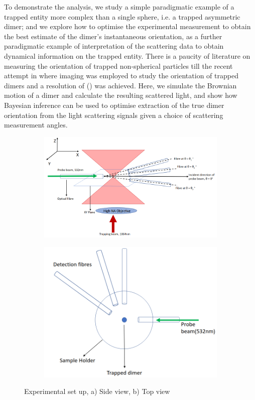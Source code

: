 \documentclass[final, 3p]{elsarticle}
\begin{document}
To demonstrate the analysis, we study a simple paradigmatic example of a trapped entity more complex than a single sphere, i.e. a trapped asymmetric dimer; and we explore how to optimise the experimental measurement to obtain the best estimate of the dimer's instantaneous orientation, as a further paradigmatic example of interpretation of the scattering data to obtain dynamical information on the trapped entity. There is a paucity of literature on measuring the orientation of trapped non-spherical particles till the recent attempt in \cite{raudsepp2022estimating} where imaging was employed to study the orientation of trapped dimers and a resolution of () was achieved. Here, we simulate the Brownian motion of a dimer and calculate the resulting scattered light, and show how Bayesian inference can be used to optimise extraction of the true dimer orientation from the light scattering signals given a choice of scattering measurement angles. 

\begin{figure}
	\centering
	\begin{subfigure}{0.45\textwidth}
		\includegraphics[width=\textwidth, height=0.25\textheight]{./Images/fig1a.png}
		\subcaption{}
	\end{subfigure}
	\begin{subfigure}{0.45\textwidth}
		\includegraphics[width=\textwidth, height=0.25\textheight]{./Images/fig1b.png}
		\subcaption{}
	\end{subfigure}
	\caption{Experimental set up, a) Side view, b) Top view }
	\label{fig:setup}
\end{figure}
\end{document}

